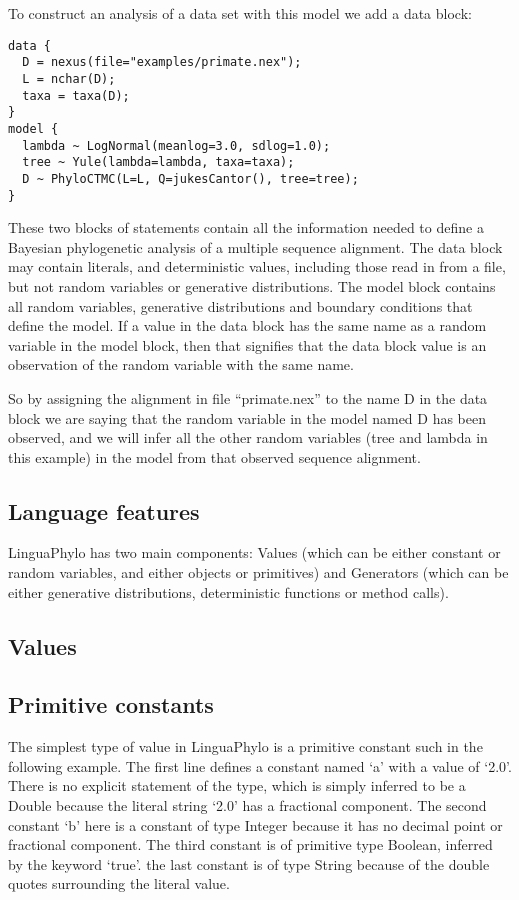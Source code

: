 \documentclass[oneside]{article}
\begin{document}
To construct an analysis of a data set with this model we add a data block:

{\singlespacing
\begin{verbatim}
data {
  D = nexus(file="examples/primate.nex");
  L = nchar(D);
  taxa = taxa(D);
}
model {
  lambda ~ LogNormal(meanlog=3.0, sdlog=1.0);
  tree ~ Yule(lambda=lambda, taxa=taxa);
  D ~ PhyloCTMC(L=L, Q=jukesCantor(), tree=tree);
}
\end{verbatim}
}

These two blocks of statements contain all the information needed to define
a Bayesian phylogenetic analysis of a multiple sequence alignment. 
The data block may contain literals, and deterministic values, including those read in from a file, but not random variables or generative distributions.
The model block contains all random variables, generative distributions and boundary conditions that define the model.
If a value in the data block has the same name as a random variable in the model block, then that signifies that the data block value is an observation of the random variable with the same name.


So by assigning the alignment in file
``primate.nex'' to the name D in the data block we are saying that the random variable in the model named D has 
been observed, and we will infer all the other random variables 
(tree and lambda in this example) in the model from that observed sequence alignment.

\subsection{Language features}

LinguaPhylo has two main components: Values (which can be either constant or random variables, and either objects or primitives) and Generators (which can be either generative distributions, deterministic functions or method calls).

\subsection{Values}

\subsection{Primitive constants}

The simplest type of value in LinguaPhylo is a primitive constant such in the following example. The first line defines a constant named `a' with a value of `2.0'. There is no explicit statement of the type, which is simply inferred to be a Double because the literal string `2.0' has a fractional component. The second constant `b' here is a constant of type Integer because it has no decimal point or fractional component. The third constant is of primitive type Boolean, inferred by the keyword `true'. the last constant is of type String because of the double quotes surrounding the literal value.
\end{document}
